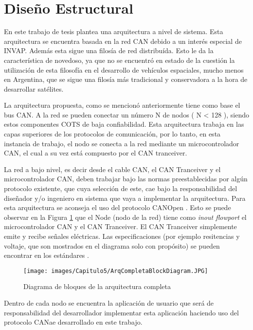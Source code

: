 \section{Diseño Estructural}
En este trabajo de tesis plantea una arquitectura a nivel de sistema.
Esta arquitectura se encuentra basada en la red CAN debido a
un interés especial de INVAP. Además esta sigue una filosía de red
distribuída. Esto le da la característica de novedoso, ya que no se 
encuentró en estado de la cuestión la utilización de esta 
filosofía en el desarrollo de vehículos espaciales, mucho menos en
Argentina, que se sigue una filosía más tradicional y conservadora 
a la hora de desarrollar satélites. 

La arquitectura propuesta, como se mencionó anteriormente tiene como
base el bus CAN. A la red se pueden conectar un número N de
nodos ( N < 128 ), siendo estos componentes COTS de baja confiabilidad. 
Esta arquitectura trabaja en las capas superiores 
de los protocolos de comunicación, por lo tanto, en esta instancia 
de trabajo, el nodo se conecta a la red mediante un microcontrolador 
CAN, el cual a su vez está compuesto por el CAN tranceiver.

La red a bajo nivel, es decir desde el cable CAN, el CAN Tranceiver y 
el microcontrolador CAN, deben trabajar bajo las normas preestablecidas
por algún protocolo existente, que cuya selección de este, cae bajo la 
responsabilidad del diseñador y/o ingeniero en sistema que vaya 
a implementar la arquitectura. Para esta arquitectura se aconseja el uso
del protocolo CANOpen \citep{can-ciaWEB}. Esto se puede observar en la
 Figura \ref{fig:DiagramaEstructuraCompleta} que el Node (nodo de la red)
tiene como \textit{inout flowport} el microcontrolador CAN  y el
CAN Tranceiver. El CAN Tranceiver simplemente emite y recibe señales eléctricas. Las 
especificaciones (por ejemplo resitencias y voltaje, que son mostrados en el diagrama
solo con propósito) se pueden encontrar en los estándares \citep{can-ciaWEB}.

\begin{figure}[h!]
 \centering
 \texttt{[image: images/Capitulo5/ArqCompletaBlockDiagram.JPG]}
  \caption{Diagrama de bloques de la arquitectura completa}
\label{fig:DiagramaEstructuraCompleta}
\end{figure} 

Dentro de cada nodo se encuentra la aplicación de usuario que será de 
responsabilidad del desarrollador implementar esta aplicación haciendo uso
del protocolo CANae desarrollado en este trabajo.

